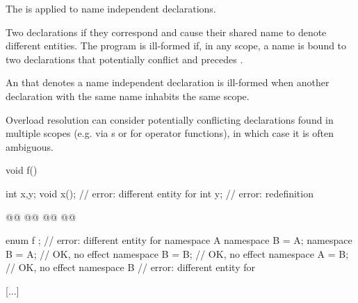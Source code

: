 \documentclass{wg21}
\begin{document}
{\begin{addedblock}
The   is applied to name independent declarations.

\end{addedblock}

Two declarations 
if they correspond and
cause their shared name to denote different entities.
The program is ill-formed
if, in any scope, a name is bound to two declarations 
that potentially conflict and  precedes  .

\begin{addedblock}
\begin{note}
An  that denotes a name independent declaration is ill-formed when another declaration with the same name inhabits the same scope.
\end{note}
\end{addedblock}


\begin{note}
	Overload resolution can consider potentially conflicting declarations
	found in multiple scopes
	(e.g. via s or for operator functions),
	in which case it is often ambiguous.
\end{note}
\begin{example}
	\begin{codeblock}
		void f() {
			int x,y;
			void x();             // error: different entity for 
			int y;                  // error: redefinition

                        @@
			@@
                        @@
			@@
		}
		enum { f };             // error: different entity for 
		namespace A {}
		namespace B = A;
		namespace B = A;        // OK, no effect
		namespace B = B;        // OK, no effect
		namespace A = B;        // OK, no effect
		namespace B {}          // error: different entity for 
	\end{codeblock}
\end{example}

\textcolor{noteclr}{[...]}

}
\end{document}
